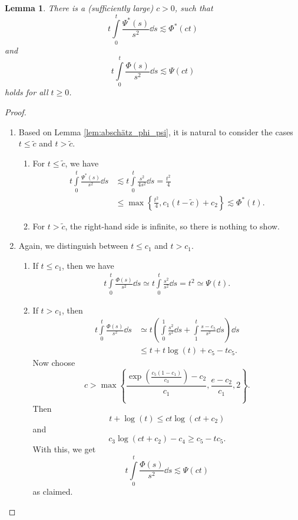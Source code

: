 \documentclass[a4paper,11pt]{amsart}
\numberwithin{equation}{section}
\newtheorem{lemma}[defi]{Lemma}
\begin{document}
	\begin{lemma}\label{lemma:cond}
		There is a (sufficiently large) $c > 0$, such that 
		\begin{equation}
			t \int \limits_{0}^t \frac{\Psi^*(s)}{s^2} \dd{s} \lesssim \Phi^*(ct)
		\end{equation}
		and \begin{equation}
			t \int \limits_{0}^t \frac{\Phi(s)}{s^2} \dd{s} \lesssim \Psi(ct)
		\end{equation}
		holds for all $t \geq 0$.
	\end{lemma}
	\begin{proof}
		\begin{enumerate}
			\item Based on Lemma \ref{lem:abschätz_phi_psi}, it is natural to consider the cases $t\leq \tilde{c}$ and $t>\tilde{c}$. \begin{enumerate}
				\item For $t \leq \tilde{c}$, we have \begin{align*}
					t \int \limits_{0}^t \frac{\Psi^*(s)}{s^2} \dd{s}  &\lesssim t \int \limits_0^t \frac{s^2}{4s^2} \dd{s}  = \frac{t^2}{4} \\ & \leq \max \left\{ \frac{t^2}{4}, c_1(t-\tilde{c})+c_2 \right\} \lesssim \Phi^*(t).
				\end{align*}
				\item For $t>\tilde{c}$, the right-hand side is infinite, so there is nothing to show.
			\end{enumerate}
			\item Again, we distinguish between $t \leq c_1$ and $t>c_1$.
			\begin{enumerate}
				\item If $t \leq c_1$, then we have \begin{align*}
					t \int \limits_{0}^t \frac{\Phi(s)}{s^2} \dd{s}  \simeq t \int \limits_{0}^t \frac{s^2}{s^2} \dd{s} = t^2 \simeq \Psi(t).
				\end{align*}
				\item If $t > c_1$, then \begin{align*}
					t \int \limits_{0}^t \frac{\Phi(s)}{s^2} \dd{s}  & \simeq t \left( \int \limits_{0}^1 \frac{s^2}{s^2} \dd{s} + \int \limits_{1}^t \frac{s-c_5}{s^2} \dd{s}  \right) \dd{s} \\ & \leq t + t\log(t) + c_5- tc_5.
				\end{align*}
				Now choose \[
				c > \max  \left\{ \frac{\exp(\frac{c_5(1-c_1)}{c_3}) - c_2}{c_1}, \frac{e-c_2}{c_1}, 2 \right\}.
				\]
				Then \[
				t + \log(t) \leq ct\log(ct+c_2)
				\]
				and \[
				c_3 \log(ct+c_2) - c_4 \geq c_5 - t c_5.
				\]
				With this, we get \[
				t \int \limits_{0}^t \frac{\Phi(s)}{s^2} \dd{s} \lesssim \Psi(ct)
				\]
				as claimed.
			\end{enumerate}
		\end{enumerate}    
	\end{proof}
	
\end{document}
